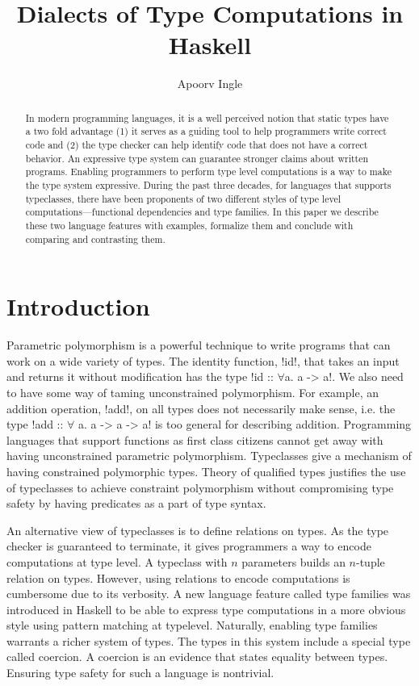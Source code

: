 \documentclass[format=sigplan,manuscript,review,screen,nonacm,margin=1in]{acmart}
\title{Dialects of Type Computations in Haskell}
\author{Apoorv Ingle}
\affiliation{%
  \institution{University of Iowa}
  \department{Department of Computer Science}
  \streetaddress{McLean Hall}
  \city{Iowa City}
  \state{Iowa}
  \country{USA}}
\begin{document}
\begin{abstract}
In modern programming languages, it is a well perceived notion
that static types have a two fold advantage (1) it serves as a guiding tool to help programmers
write correct code and (2) the type checker can help identify
code that does not have a correct behavior. An expressive type system
can guarantee stronger claims about written programs. Enabling programmers to perform
type level computations is a way to make the type system expressive.
During the past three decades, for languages that supports typeclasses, there have been proponents
of two different styles of type level computations---functional dependencies and type families.
In this paper we describe these two language features with examples, formalize them and
conclude with comparing and contrasting them.
\end{abstract}
\maketitle

\section{Introduction}
Parametric polymorphism is a powerful technique to write programs that can work on
a wide variety of types. The identity function, !id!, that takes an input and returns it
without modification has the type !id :: $\forall$a. a -> a!.
We also need to have some way of taming unconstrained polymorphism.
For example, an addition operation, !add!, on all types does not necessarily make sense,
i.e. the type !add :: $\forall$ a. a -> a -> a! is too general for describing addition.
Programming languages that support functions as first class citizens
cannot get away with having unconstrained parametric polymorphism.
Typeclasses\cite{wadler_polymorphism_1989} give a mechanism
of having constrained polymorphic types. Theory of qualified types\cite{jones_qualified_1994}
justifies the use of typeclasses to achieve constraint polymorphism without compromising
type safety by having predicates as a part of type syntax.

An alternative view of typeclasses is to define relations on types. As the
type checker is guaranteed to terminate, it gives programmers a way to encode computations at type level.
A typeclass with $n$ parameters builds an $n$-tuple relation on types. However, using
relations to encode computations is cumbersome due to its verbosity. A new language feature
called type families\cite{schrijvers_towards_2007} was introduced in Haskell
to be able to express type computations in a more obvious style using pattern matching at typelevel.
Naturally, enabling type families warrants a richer system of types.
The types in this system include a special type called coercion. A coercion is an evidence
that states equality between types. Ensuring type safety for such a language is nontrivial.
\end{document}
